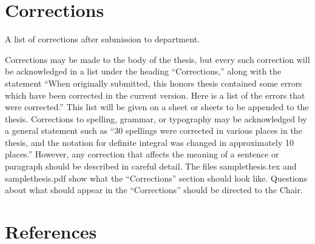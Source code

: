 \documentclass[12pt, twoside]{amherstthesis}
\begin{document}
\hypertarget{corrections}{%
\chapter*{Corrections}\label{corrections}}

A list of corrections after submission to department.

Corrections may be made to the body of the thesis, but every such correction will be acknowledged in a list under the heading ``Corrections,'' along with the statement ``When originally submitted, this honors thesis contained some errors which have been corrected in the current version. Here is a list of the errors that were corrected.'' This list will be given on a sheet or sheets to be appended to the thesis. Corrections to spelling, grammar, or typography may be acknowledged by a general statement such as ``30 spellings were corrected in various places in the thesis, and the notation for definite integral was changed in approximately 10 places.'' However, any correction that affects the meaning of a sentence or paragraph should be described in careful detail. The files samplethesis.tex and samplethesis.pdf show what the ``Corrections'' section should look like. Questions about what should appear in the ``Corrections'' should be directed to the Chair.

\backmatter

\hypertarget{references}{%
\chapter*{References}\label{references}}

\noindent

\setlength{\parindent}{-0.20in}
\setlength{\leftskip}{0.20in}
\setlength{\parskip}{8pt}
\end{document}
